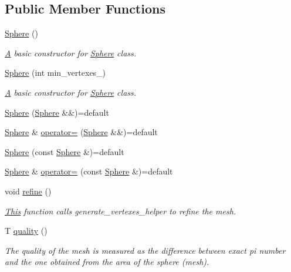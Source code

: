 \subsection*{Public Member Functions}
\begin{DoxyCompactItemize}
\item 
\mbox{\hyperlink{classSphere_acacfd6de079ea50acdaf57b823166651}{Sphere}} ()
\begin{DoxyCompactList}\small\item\em \mbox{\hyperlink{classA}{A}} basic constructor for \mbox{\hyperlink{classSphere}{Sphere}} class. \end{DoxyCompactList}\item 
\mbox{\hyperlink{classSphere_a79e3c1cb536e3fe4d8bc447e7be0e414}{Sphere}} (int min\+\_\+vertexes\+\_\+)
\begin{DoxyCompactList}\small\item\em \mbox{\hyperlink{classA}{A}} basic constructor for \mbox{\hyperlink{classSphere}{Sphere}} class. \end{DoxyCompactList}\item 
\mbox{\hyperlink{classSphere_af0d667b078ae88955113205112d9aaa6}{Sphere}} (\mbox{\hyperlink{classSphere}{Sphere}} \&\&)=default
\item 
\mbox{\hyperlink{classSphere}{Sphere}} \& \mbox{\hyperlink{classSphere_aa117f966cea7b16532cbd80c2191a84a}{operator=}} (\mbox{\hyperlink{classSphere}{Sphere}} \&\&)=default
\item 
\mbox{\hyperlink{classSphere_ae28ad7649c59d653b9e14a3042d186a1}{Sphere}} (const \mbox{\hyperlink{classSphere}{Sphere}} \&)=default
\item 
\mbox{\hyperlink{classSphere}{Sphere}} \& \mbox{\hyperlink{classSphere_ae989d05c3ea71f5a758e90e2f2e3aecf}{operator=}} (const \mbox{\hyperlink{classSphere}{Sphere}} \&)=default
\item 
void \mbox{\hyperlink{classSphere_a3f5ee2b07e48a360696fe983690d1d1f}{refine}} ()
\begin{DoxyCompactList}\small\item\em \mbox{\hyperlink{classThis}{This}} function calls generate\+\_\+vertexes\+\_\+helper to refine the mesh. \end{DoxyCompactList}\item 
T \mbox{\hyperlink{classSphere_a9ebc65dabaf8d87fbe599f4b64816f73}{quality}} ()
\begin{DoxyCompactList}\small\item\em The quality of the mesh is measured as the difference between exact pi number and the one obtained from the area of the sphere (mesh). \end{DoxyCompactList}\end{DoxyCompactItemize}
